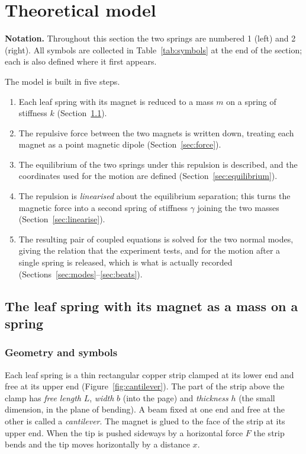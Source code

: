 \documentclass[11pt,a4paper]{article}
\begin{document}
\section{Theoretical model}\label{sec:theory}

\noindent\textbf{Notation.} Throughout this section the two springs are numbered 1 (left) and 2 (right). All symbols are collected in Table~\ref{tab:symbols} at the end of the section; each is also defined where it first appears.

\medskip
The model is built in five steps.
\begin{enumerate}[nosep,leftmargin=1.8em]
\item Each leaf spring with its magnet is reduced to a mass $m$ on a spring of stiffness $k$ (Section~\ref{sec:spring}).
\item The repulsive force between the two magnets is written down, treating each magnet as a point magnetic dipole (Section~\ref{sec:force}).
\item The equilibrium of the two springs under this repulsion is described, and the coordinates used for the motion are defined (Section~\ref{sec:equilibrium}).
\item The repulsion is \emph{linearised} about the equilibrium separation; this turns the magnetic force into a second spring of stiffness $\gamma$ joining the two masses (Section~\ref{sec:linearise}).
\item The resulting pair of coupled equations is solved for the two normal modes, giving the relation that the experiment tests, and for the motion after a single spring is released, which is what is actually recorded (Sections~\ref{sec:modes}--\ref{sec:beats}).
\end{enumerate}

\subsection{The leaf spring with its magnet as a mass on a spring}\label{sec:spring}

\subsubsection{Geometry and symbols}

Each leaf spring is a thin rectangular copper strip clamped at its lower end and free at its upper end (Figure~\ref{fig:cantilever}). The part of the strip above the clamp has \emph{free length} $L$, \emph{width} $b$ (into the page) and \emph{thickness} $h$ (the small dimension, in the plane of bending). A beam fixed at one end and free at the other is called a \emph{cantilever}. The magnet is glued to the face of the strip at its upper end. When the tip is pushed sideways by a horizontal force $F$ the strip bends and the tip moves horizontally by a distance $x$.
\end{document}
